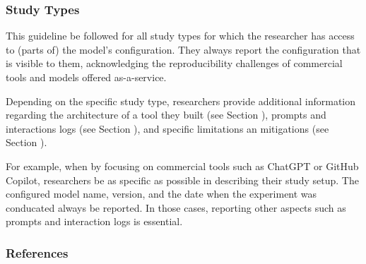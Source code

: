 
\subsubsection{Study Types}

This guideline \must be followed for all study types for which the researcher has access to (parts of) the model's configuration.
They \must always report the configuration that is visible to them, acknowledging the reproducibility challenges of commercial tools and models offered as-a-service. 

Depending on the specific study type, researchers \should provide additional information regarding the architecture of a tool they built (see Section \toolarchitecture), prompts and interactions logs (see Section \prompts), and specific limitations an mitigations (see Section \limitationsmitigations).


For example, when \llmusage by focusing on commercial tools such as ChatGPT or GitHub Copilot, researchers \must be as specific as possible in describing their study setup.
The configured model name, version, and the date when the experiment was conducated \must always be reported.
In those cases, reporting other aspects such as prompts and interaction logs is essential.


\subsubsection{References}





